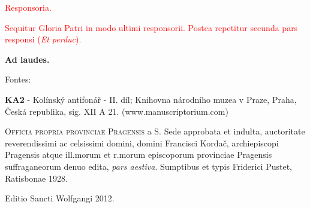 \documentclass[a4paper, twoside, 12pt]{article}
\newcommand{\modusinfo}[1]{\gresetfirstlineaboveinitial{\small #1}{\small #1}}
\newcommand{\rubrum}[1]{\textcolor{red}{#1}}
\newcommand{\rubrica}[1]{\vspace{3mm} \rubrum{\small #1}}
\newcommand{\hora}[1]{\vspace{1cm}\noindent\textbf{#1}\vspace{5mm}
}
\newcommand{\parsHorae}[1]{\rubrum{#1}\vspace{2mm}}
\begin{document}
\parsHorae{Responsoria.}


\modusinfo{II}

\rubrica{Sequitur Gloria Patri in modo ultimi responsorii. Postea repetitur
secunda pars responsi (\textit{Et perduc}).}


\hora{Ad laudes.}



\pagebreak

Fontes:

\vspace{1cm}
\textbf{KA2} - Kolínský antifonář - II. díl; 
Knihovna národního muzea v Praze, Praha, Česká republika, sig. XII A 21. 
(www.manuscriptorium.com)

\vspace{1cm}
\textsc{Officia propria provinciae Pragensis}
a S. Sede approbata et indulta,
auctoritate reverendissimi ac celsissimi domini, domini Francisci Kordač,
archiepiscopi Pragensis atque ill.morum et r.morum episcoporum
provinciae Pragensis suffraganeorum denuo edita,
\textit{pars aestiva}. Sumptibus et typis Friderici Pustet, Ratisbonae 1928.

\vfill

\begin{center}
Editio Sancti Wolfgangi 2012.
\end{center}
\end{document}
